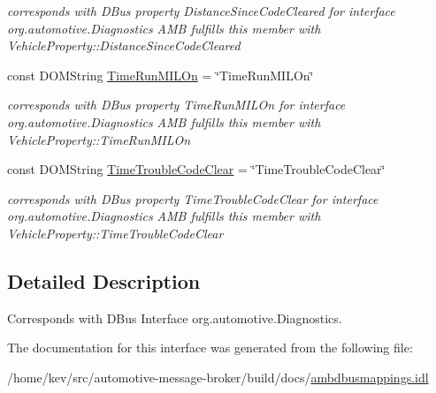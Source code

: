 \begin{DoxyCompactItemize}
\begin{DoxyCompactList}\small\item\em corresponds with D\+Bus property Distance\+Since\+Code\+Cleared for interface org.\+automotive.\+Diagnostics A\+M\+B fulfills this member with Vehicle\+Property\+::\+Distance\+Since\+Code\+Cleared \end{DoxyCompactList}\item 
\hypertarget{interfaceDiagnostics_a3eabf393dc6417cc6e6be8010eb753f0}{const D\+O\+M\+String \hyperlink{interfaceDiagnostics_a3eabf393dc6417cc6e6be8010eb753f0}{Time\+Run\+M\+I\+L\+On} = \char`\"{}Time\+Run\+M\+I\+L\+On\char`\"{}}\label{interfaceDiagnostics_a3eabf393dc6417cc6e6be8010eb753f0}

\begin{DoxyCompactList}\small\item\em corresponds with D\+Bus property Time\+Run\+M\+I\+L\+On for interface org.\+automotive.\+Diagnostics A\+M\+B fulfills this member with Vehicle\+Property\+::\+Time\+Run\+M\+I\+L\+On \end{DoxyCompactList}\item 
\hypertarget{interfaceDiagnostics_a1fbd44d083a78a6e29621d2168004f63}{const D\+O\+M\+String \hyperlink{interfaceDiagnostics_a1fbd44d083a78a6e29621d2168004f63}{Time\+Trouble\+Code\+Clear} = \char`\"{}Time\+Trouble\+Code\+Clear\char`\"{}}\label{interfaceDiagnostics_a1fbd44d083a78a6e29621d2168004f63}

\begin{DoxyCompactList}\small\item\em corresponds with D\+Bus property Time\+Trouble\+Code\+Clear for interface org.\+automotive.\+Diagnostics A\+M\+B fulfills this member with Vehicle\+Property\+::\+Time\+Trouble\+Code\+Clear \end{DoxyCompactList}\end{DoxyCompactItemize}


\subsection{Detailed Description}
Corresponds with D\+Bus Interface org.\+automotive.\+Diagnostics. 

The documentation for this interface was generated from the following file\+:\begin{DoxyCompactItemize}
\item 
/home/kev/src/automotive-\/message-\/broker/build/docs/\hyperlink{ambdbusmappings_8idl}{ambdbusmappings.\+idl}\end{DoxyCompactItemize}
